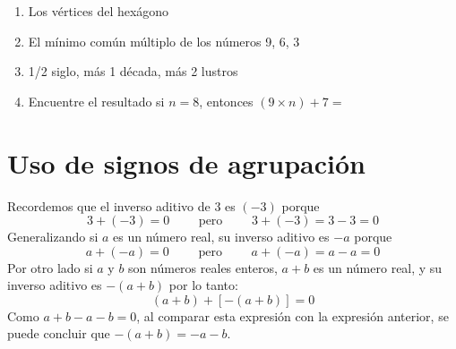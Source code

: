 \documentclass[10pt,twoside]{article}
\begin{document}
\begin{enumerate}
  \item Los vértices del hexágono
  \item El mínimo común múltiplo de los números 9, 6, 3
  \item 1/2 siglo, más 1 década, más 2 lustros
  \item Encuentre el resultado si $ n=8 $, entonces $ (9\times n)+7= $
\end{enumerate}
\section{Uso de signos de agrupación}
Recordemos que el inverso aditivo de $3$ es $(-3)$ porque
\[ 3+(-3)=0 \qquad \text{ pero } \qquad 3+(-3)=3-3=0 \]
Generalizando si $a$ es un número real, su inverso aditivo es $-a$ porque
\[ a+(-a)=0 \qquad \text{ pero } \qquad a+(-a)=a-a=0 \]
Por otro lado si $a$ y $b$ son números reales enteros, $a + b$ es un número real, y su inverso aditivo es $- (a + b)$ por lo tanto:
\[ (a+b)+[-(a+b)]=0 \]
Como $a + b - a - b = 0$, al comparar esta expresión con la expresión anterior, se puede concluir que $- (a + b) = -a - b$.
\end{document}
